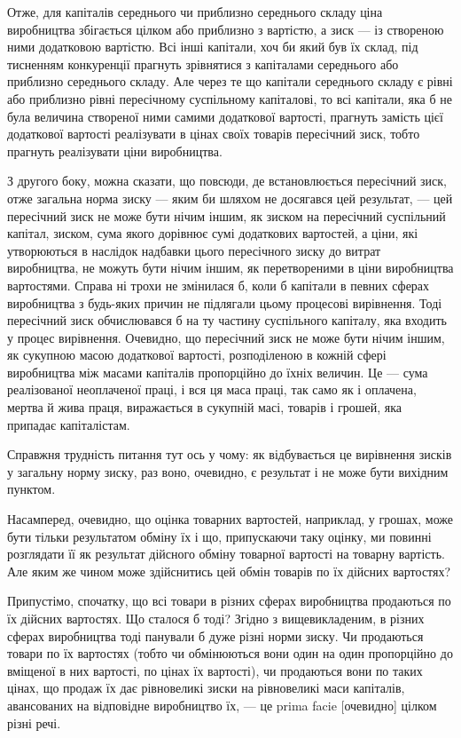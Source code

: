 Отже, для капіталів середнього чи приблизно середнього
складу ціна виробництва збігається цілком або приблизно з вартістю,
а зиск — із створеною ними додатковою вартістю. Всі інші
капітали, хоч би який був їх склад, під тисненням конкуренції
прагнуть зрівнятися з капіталами середнього або приблизно
середнього складу. Але через те що капітали середнього складу
є рівні або приблизно рівні пересічному суспільному капіталові,
то всі капітали, яка б не була величина створеної ними самими
додаткової вартості, прагнуть замість цієї додаткової вартості
реалізувати в цінах своїх товарів пересічний зиск, тобто прагнуть реалізувати ціни виробництва.

З другого боку, можна сказати, що повсюди, де встановлюється пересічний зиск, отже загальна норма
зиску — яким би
шляхом не досягався цей результат, — цей пересічний зиск не
може бути нічим іншим, як зиском на пересічний суспільний
капітал, зиском, сума якого дорівнює сумі додаткових вартостей,
а ціни, які утворюються в наслідок надбавки цього пересічного
зиску до витрат виробництва, не можуть бути нічим іншим, як
перетвореними в ціни виробництва вартостями. Справа ні трохи
не змінилася б, коли б капітали в певних сферах виробництва
з будь-яких причин не підлягали цьому процесові вирівнення.
Тоді пересічний зиск обчислювався б на ту частину суспільного
капіталу, яка входить у процес вирівнення. Очевидно, що пересічний зиск не може бути нічим іншим, як
сукупною масою
додаткової вартості, розподіленою в кожній сфері виробництва
між масами капіталів пропорційно до їхніх величин. Це — сума
реалізованої неоплаченої праці, і вся ця маса праці, так само як
і оплачена, мертва й жива праця, виражається в сукупній масі,
товарів і грошей, яка припадає капіталістам.

Справжня трудність питання тут ось у чому: як відбувається
це вирівнення зисків у загальну норму зиску, раз воно, очевидно, є результат і не може бути вихідним
пунктом.

Насамперед, очевидно, що оцінка товарних вартостей, наприклад, у грошах, може бути тільки
результатом обміну їх і що,
припускаючи таку оцінку, ми повинні розглядати її як результат
дійсного обміну товарної вартості на товарну вартість. Але
яким же чином може здійснитись цей обмін товарів по їх дійсних вартостях?

Припустімо, спочатку, що всі товари в різних сферах виробництва продаються по їх дійсних вартостях.
Що сталося б
тоді? Згідно з вищевикладеним, в різних сферах виробництва
тоді панували б дуже різні норми зиску. Чи продаються товари
по їх вартостях (тобто чи обмінюються вони один на один пропорційно до вміщеної в них вартості, по
цінах їх вартості),
чи продаються вони по таких цінах, що продаж їх дає рівновеликі зиски на рівновеликі маси капіталів,
авансованих на відповідне виробництво їх, — це prima facie [очевидно] цілком різні речі.


